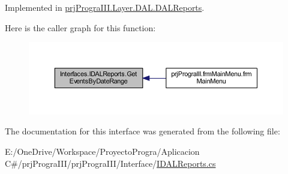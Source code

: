 Implemented in \hyperlink{classprj_progra_i_i_i_1_1_layer_1_1_d_a_l_1_1_d_a_l_reports_a2046b157360d6d30057943ea83437458}{prj\+Progra\+I\+I\+I.\+Layer.\+D\+A\+L.\+D\+A\+L\+Reports}.

Here is the caller graph for this function\+:
\nopagebreak
\begin{figure}[H]
\begin{center}
\leavevmode
\includegraphics[width=350pt]{interface_interfaces_1_1_i_d_a_l_reports_a7cd9a35b355b8b8ae6dfc43b715758af_icgraph}
\end{center}
\end{figure}


The documentation for this interface was generated from the following file\+:\begin{DoxyCompactItemize}
\item 
E\+:/\+One\+Drive/\+Workspace/\+Proyecto\+Progra/\+Aplicacion C\#/prj\+Progra\+I\+I\+I/prj\+Progra\+I\+I\+I/\+Interface/\hyperlink{_i_d_a_l_reports_8cs}{I\+D\+A\+L\+Reports.\+cs}\end{DoxyCompactItemize}
